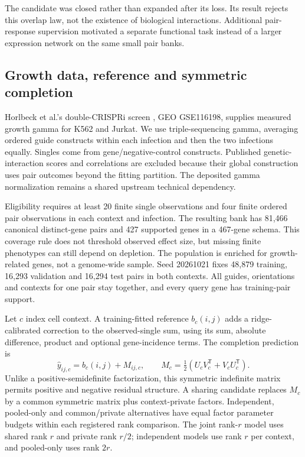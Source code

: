 The candidate was closed rather than expanded after its loss. Its result rejects this overlap law, not the existence of biological interactions. Additional pair-response supervision motivated a separate functional task instead of a larger expression network on the same small pair banks.

\subsection{Growth data, reference and symmetric completion}
Horlbeck et al.'s double-CRISPRi screen \citep{horlbeck2018}, GEO GSE116198, supplies measured growth gamma for K562 and Jurkat. We use triple-sequencing gamma, averaging ordered guide constructs within each infection and then the two infections equally. Singles come from gene/negative-control constructs. Published genetic-interaction scores and correlations are excluded because their global construction uses pair outcomes beyond the fitting partition. The deposited gamma normalization remains a shared upstream technical dependency.

Eligibility requires at least 20 finite single observations and four finite ordered pair observations in each context and infection. The resulting bank has 81,466 canonical distinct-gene pairs and 427 supported genes in a 467-gene schema. This coverage rule does not threshold observed effect size, but missing finite phenotypes can still depend on depletion. The population is enriched for growth-related genes, not a genome-wide sample. Seed 20261021 fixes 48,879 training, 16,293 validation and 16,294 test pairs in both contexts. All guides, orientations and contexts for one pair stay together, and every query gene has training-pair support.

Let $c$ index cell context. A training-fitted reference $b_c(i,j)$ adds a ridge-calibrated correction to the observed-single sum, using its sum, absolute difference, product and optional gene-incidence terms. The completion prediction is
\begin{equation}
\widehat y_{ij,c}=b_c(i,j)+M_{ij,c},\qquad
M_c=\tfrac12(U_cV_c^{\mathsf T}+V_cU_c^{\mathsf T}).
\end{equation}
Unlike a positive-semidefinite factorization, this symmetric indefinite matrix permits positive and negative residual structure. A sharing candidate replaces $M_c$ by a common symmetric matrix plus context-private factors. Independent, pooled-only and common/private alternatives have equal factor parameter budgets within each registered rank comparison. The joint rank-$r$ model uses shared rank $r$ and private rank $r/2$; independent models use rank $r$ per context, and pooled-only uses rank $2r$.

